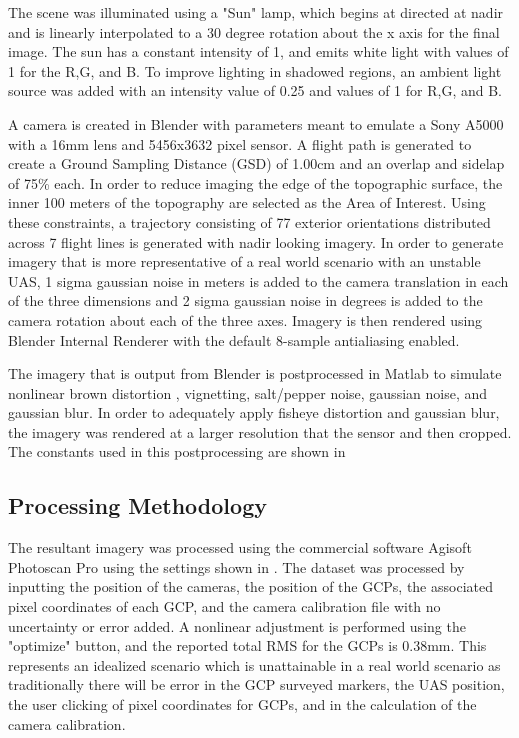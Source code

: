 The scene was illuminated using a "Sun" lamp, which begins at directed at nadir and is linearly interpolated to a 30 degree rotation about the x axis for the final image. The sun has a constant intensity of 1, and emits white light with values of 1 for the R,G, and B.  To improve lighting in shadowed regions, an ambient light source was added with an intensity value of 0.25 and values of 1 for R,G, and B.  



A camera is created in Blender with parameters meant to emulate a Sony A5000 with a 16mm lens and 5456x3632 pixel sensor.  A flight path is generated to create a Ground Sampling Distance (GSD) of 1.00cm and an overlap and sidelap of 75\% each.  In order to reduce imaging the edge of the topographic surface, the inner 100 meters of the topography are selected as the Area of Interest.  Using these constraints, a trajectory consisting of 77 exterior orientations distributed across 7 flight lines is generated with nadir looking imagery.  In order to generate imagery that is more representative of a real world scenario with an unstable UAS, 1 sigma gaussian noise in meters is added to the camera translation in each of the three dimensions and 2 sigma gaussian noise in degrees is added to the camera rotation about each of the three axes.  Imagery is then rendered using Blender Internal Renderer with the default 8-sample antialiasing enabled.

The imagery that is output from Blender is postprocessed in Matlab to simulate nonlinear brown distortion , vignetting, salt/pepper noise, gaussian noise, and gaussian blur.  In order to adequately apply fisheye distortion and gaussian blur, the imagery was rendered at a larger resolution that the sensor and then cropped.  The constants used in this postprocessing are shown in   



\subsection{Processing Methodology}
The resultant imagery was processed using the commercial software Agisoft Photoscan Pro using the settings shown in .  The dataset was processed by inputting the position of the cameras, the position of the GCPs, the associated pixel coordinates of each GCP, and the camera calibration file with no uncertainty or error added.  A nonlinear adjustment is performed using the "optimize" button, and the reported total RMS for the GCPs is 0.38mm.  This represents an idealized scenario which is unattainable in a real world scenario as traditionally there will be error in the GCP surveyed markers, the UAS position, the user clicking of pixel coordinates for GCPs, and in the calculation of the camera calibration.  

